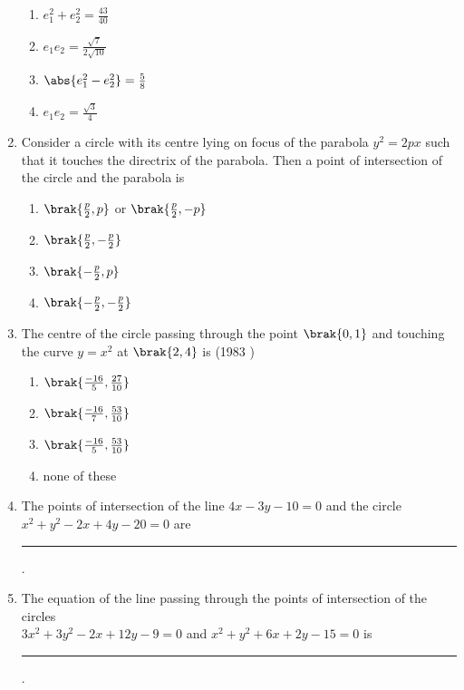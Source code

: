 \begin{enumerate}[label=\thesubsection.\arabic*.,ref=\thesubsection.\theenumi]
		 \begin{multicols}{4}
\begin{enumerate}
			\item $e_1^2+e_2^2=\frac{43}{40}$
			\item $e_1e_2=\frac{\sqrt{7}}{2\sqrt{10}}$
			\item $\abs{ e_1^2-e_2^2}=\frac{5}{8}$
			\item $e_1e_2=\frac{\sqrt{3}}{4}$ 
		 \end{enumerate}
\end{multicols}
\item Consider a circle with its centre lying on focus of the parabola $y^2=2px$ such that it touches the directrix of the parabola. Then a point of intersection of the circle and the parabola is
        \hfill{}
\begin{multicols}{2}
\begin{enumerate}
    \item $\brak{\frac{p}{2},p}$ or $\brak{\frac{p}{2},-p}$
    \item $\brak{\frac{p}{2},-\frac{p}{2}}$
    \item $\brak{-\frac{p}{2},p}$
    \item $\brak{-\frac{p}{2},-\frac{p}{2}}$
\end{enumerate}
\end{multicols}
    \item The centre of the circle passing through the point $\brak{0,1}$ and touching the curve $y = x^{2}$ at $\brak{2, 4}$ is
    \hfill {(1983 )}
    	\begin{multicols}{4}
\begin{enumerate}
    		\item $\brak{\frac{-16}{5}, \frac{27}{10}}$
    		\item $\brak{\frac{-16}{7}, \frac{53}{10}}$
    		\item $\brak{\frac{-16}{5}, \frac{53}{10}}$
    		\item none of these
    	\end{enumerate}
    \end{multicols}
\item The points of intersection of the line $4x-3y-10=0$ and the circle $x^{2}+y^{2}-2x+4y-20=0$ are    \rule{1cm}{0.01pt}.
	\hfill{}
\item The equation of the line passing through the points of intersection of the circles\\ $3x^{2}+3y^{2}-2x+12y-9=0$ and $x^{2}+y^{2}+6x+2y-15=0$ is
\rule{1cm}{0.01pt}.

\end{enumerate}
